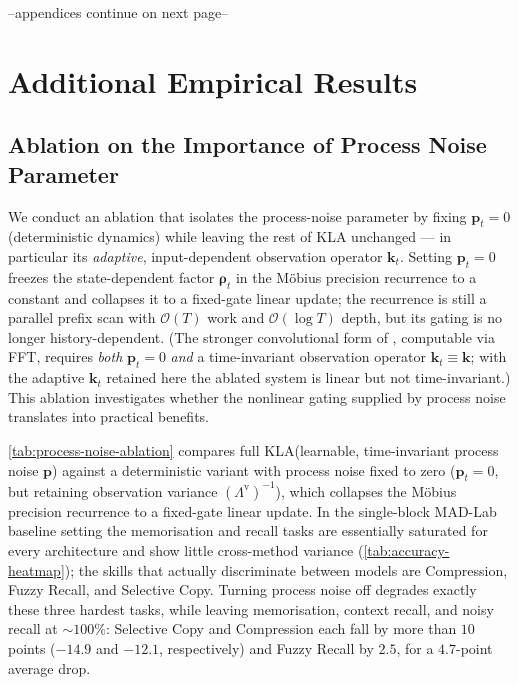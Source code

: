 \documentclass{article}
\newcommand{\our}{\textsc{KLA}\xspace}
\begin{document}
\vfill
\begin{center}
    --appendices continue on next page--
\end{center}

\clearpage
\section{Additional Empirical Results}
\label{app:empirical}

\subsection{Ablation on the Importance of Process Noise Parameter}
\label{sec:gauss-variants}

We conduct an ablation that isolates the process-noise parameter by fixing $\mathbf{p}_t = 0$ (deterministic dynamics) while leaving the rest of \our unchanged --- in particular its \emph{adaptive}, input-dependent observation operator $\mathbf{k}_t$. Setting $\mathbf{p}_t = 0$ freezes the state-dependent factor $\boldsymbol{\rho}_t$ in the M\"{o}bius precision recurrence to a constant and collapses it to a fixed-gate linear update; the recurrence is still a parallel prefix scan with $\mathcal{O}(T)$ work and $\mathcal{O}(\log T)$ depth, but its gating is no longer history-dependent. (The stronger convolutional form of , computable via FFT, requires \emph{both} $\mathbf{p}_t = 0$ \emph{and} a time-invariant observation operator $\mathbf{k}_t \equiv \mathbf{k}$; with the adaptive $\mathbf{k}_t$ retained here the ablated system is linear but not time-invariant.) This ablation investigates whether the nonlinear gating supplied by process noise translates into practical benefits.

\cref{tab:process-noise-ablation} compares full \our (learnable, time-invariant process noise $\mathbf{p}$) against a deterministic variant with process noise fixed to zero ($\mathbf{p}_t{=}0$, but retaining observation variance $(\Lambda^{\mathrm{v}})^{-1}$), which collapses the M\"{o}bius precision recurrence to a fixed-gate linear update. In the single-block MAD-Lab baseline setting the memorisation and recall tasks are essentially saturated for every architecture and show little cross-method variance (\cref{tab:accuracy-heatmap}); the skills that actually discriminate between models are Compression, Fuzzy Recall, and Selective Copy. Turning process noise off degrades exactly these three hardest tasks, while leaving memorisation, context recall, and noisy recall at ${\sim}100\%$: Selective Copy and Compression each fall by more than $10$ points ($-14.9$ and $-12.1$, respectively) and Fuzzy Recall by $2.5$, for a $4.7$-point average drop.
\end{document}
